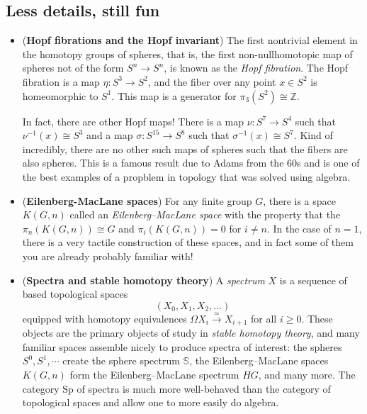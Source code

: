 \documentclass[10pt]{amsart}
\theoremstyle{definition}
\newcommand{\cdef}[1]{\textcolor{Bittersweet}{#1}}
\begin{document}
\subsection*{Less details, still fun}
\begin{itemize}
    \item (\textbf{Hopf fibrations and the Hopf invariant}) The first nontrivial element in the homotopy groups of spheres, that is, the first non-nullhomotopic map of spheres not of the form $S^n \to S^n$, is known as the \cdef{\emph{Hopf fibration}}.
    The Hopf fibration is a map $\eta:S^3 \to S^2$, and the fiber over any point $x \in S^2$ is homeomorphic to $S^1$.
    This map is a generator for $\pi_3(S^2) \cong \mathbb{Z}$.

    In fact, there are other Hopf maps! There is a map $\nu:S^7 \to S^4$ such that $\nu^{-1}(x) \cong S^3$ and a map $\sigma:S^{15}\to S^8$ such that $\sigma^{-1}(x) \cong S^7$.
    Kind of incredibly, there are no other such maps of spheres such that the fibers are also spheres.
    This is a famous result due to Adams from the 60s and is one of the best examples of a propblem in topology that was solved using algebra.

    \item (\textbf{Eilenberg-MacLane spaces}) For any finite group $G$, there is a space $K(G, n)$ called an \cdef{\emph{Eilenberg--MacLane space}} with the property that the $\pi_n(K(G, n)) \cong G$ and $\pi_i(K(G, n))=0$ for $i \neq n$.
    In the case of $n=1$, there is a very tactile construction of these spaces, and in fact some of them you are already probably familiar with!

    \item (\textbf{Spectra and stable homotopy theory}) A \cdef{\emph{spectrum}} $X$ is a sequence of based topological spaces 
    \[(X_0, X_1, X_2, \dots)\]
    equipped with homotopy equivalences $\Omega X_i \xrightarrow{\simeq} X_{i+1}$ for all $i \geq 0$.
    These objects are the primary objects of study in \cdef{\emph{stable homotopy theory}}, and many familiar spaces assemble nicely to produce spectra of interest: the spheres $S^0, S^1, \cdots$ create the sphere spectrum $\mathbb{S}$, the Eilenberg--MacLane spaces  $K(G, n)$ form the Eilenberg--MacLane spectrum $HG$, and many more.
    The category $\text{Sp}$ of spectra is much more well-behaved than the category of topological spaces and allow one to more easily do algebra.
\end{itemize}
\end{document}
